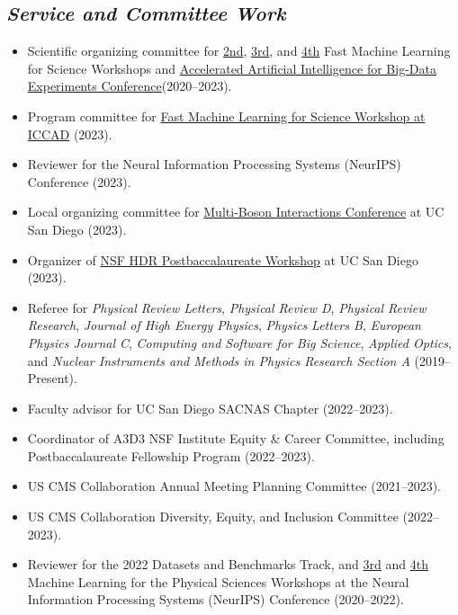 \documentclass[11pt]{res}
\newcommand{\MarginText}[1]{\section{\textit{#1}}}
\begin{document}
\begin{resume}

  \MarginText{Service and Committee Work}

  \begin{itemize}
    \itemsep-0.3em
    \item Scientific organizing committee for \href{https://indico.cern.ch/e/fml2020}{2nd}, \href{https://indico.cern.ch/e/fml2022}{3rd}, and \href{https://indico.cern.ch/e/fastml2023}{4th} Fast Machine Learning for Science Workshops and \href{http://www.ncsa.illinois.edu/Conferences/AcceleratedAINCSA/}{Accelerated Artificial Intelligence for Big-Data Experiments Conference}({2020--2023}).
    \item Program committee for \href{https://fastmachinelearning.org/iccad2023/}{Fast Machine Learning for Science Workshop at ICCAD} (2023).
    \item Reviewer for the Neural Information Processing Systems (NeurIPS) Conference ({2023}).
    \item Local organizing committee for \href{https://indico.cern.ch/e/mbi2023}{Multi-Boson Interactions Conference} at UC San Diego (2023).
    \item Organizer of \href{https://indico.cern.ch/e/hdrpostbac2023}{NSF HDR Postbaccalaureate Workshop} at UC San Diego (2023).
    \item Referee for \emph{Physical Review Letters}, \emph{Physical Review D}, \emph{Physical Review Research}, \emph{Journal of High Energy Physics}, \emph{Physics Letters B}, \emph{European Physics Journal C}, \emph{Computing and Software for Big Science}, \emph{Applied Optics}, and \emph{Nuclear Instruments and Methods in Physics Research Section A} ({2019--Present}).
    \item Faculty advisor for UC San Diego SACNAS Chapter ({2022--2023}).
    \item Coordinator of A3D3 NSF Institute Equity \& Career Committee, including Postbaccalaureate Fellowship Program ({2022--2023}).
    \item US CMS Collaboration Annual Meeting Planning Committee ({2021--2023}).
    \item US CMS Collaboration Diversity, Equity, and Inclusion Committee ({2022--2023}).
    \item Reviewer for the 2022 Datasets and Benchmarks Track, and \href{https://ml4physicalsciences.github.io/2020/}{3rd} and \href{https://ml4physicalsciences.github.io/2021/}{4th} Machine Learning for the Physical Sciences Workshops at the Neural Information Processing Systems (NeurIPS) Conference ({2020--2022}).

\end{itemize}
\end{resume}
\end{document}
